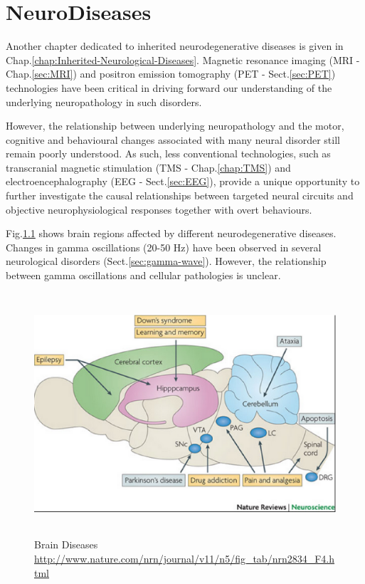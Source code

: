 \chapter{NeuroDiseases}
\label{chap:NeuroDiseases}

Another chapter dedicated to inherited neurodegenerative diseases is given in
Chap.\ref{chap:Inherited-Neurological-Diseases}. 
Magnetic resonance imaging (MRI - Chap.\ref{sec:MRI}) and positron emission
tomography (PET - Sect.\ref{sec:PET}) technologies have been critical in driving
forward our understanding of the underlying neuropathology in such disorders.

However, the relationship between underlying neuropathology and the motor,
cognitive and behavioural changes associated with many neural disorder still
remain poorly understood. As such, less conventional technologies, such as
transcranial magnetic stimulation (TMS - Chap.\ref{chap:TMS}) and
electroencephalography (EEG - Sect.\ref{sec:EEG}), provide a unique opportunity
to further investigate the causal relationships between targeted neural circuits
and objective neurophysiological responses together with overt behaviours.


Fig.\ref{fig:brain-diseases} shows brain regions affected by different
neurodegenerative diseases. Changes in gamma oscillations (20-50 Hz) have been
observed in several neurological disorders (Sect.\ref{sec:gamma-wave}). However,
the relationship between gamma oscillations and cellular pathologies is unclear.

\begin{figure}[hbt]
  \centerline{\includegraphics[height=9cm,
    angle=0]{./images/brain_diseases.eps}}
\caption{Brain Diseases
\url{http://www.nature.com/nrn/journal/v11/n5/fig_tab/nrn2834_F4.html}}
\label{fig:brain-diseases}
\end{figure}

